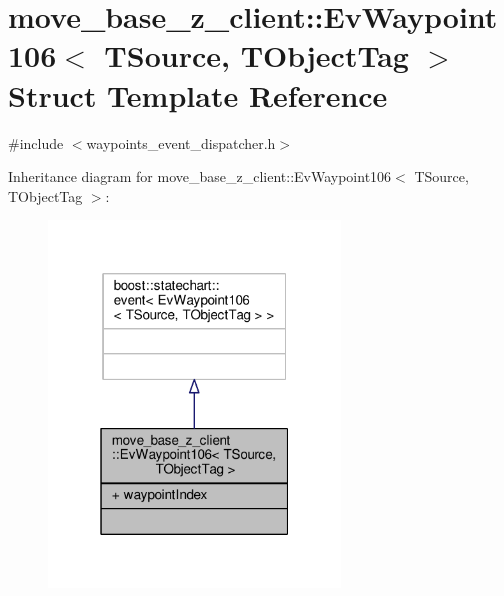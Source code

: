 \hypertarget{structmove__base__z__client_1_1EvWaypoint106}{}\section{move\+\_\+base\+\_\+z\+\_\+client\+:\+:Ev\+Waypoint106$<$ T\+Source, T\+Object\+Tag $>$ Struct Template Reference}
\label{structmove__base__z__client_1_1EvWaypoint106}


{\ttfamily \#include $<$waypoints\+\_\+event\+\_\+dispatcher.\+h$>$}



Inheritance diagram for move\+\_\+base\+\_\+z\+\_\+client\+:\+:Ev\+Waypoint106$<$ T\+Source, T\+Object\+Tag $>$\+:\nopagebreak
\begin{figure}[H]
\begin{center}
\leavevmode
\includegraphics[width=220pt]{structmove__base__z__client_1_1EvWaypoint106__inherit__graph}
\end{center}
\end{figure}


